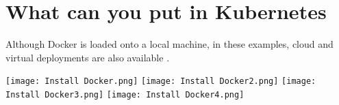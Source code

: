 \documentclass[12pt, letterpaper]{article}
\begin{document}
\section *{What can you put in Kubernetes}

Although Docker is loaded onto a local machine, in these examples,
cloud and virtual deployments are also available
\cite{hid-sp18-525-docker}. 

\texttt{[image: Install Docker.png]}
\texttt{[image: Install Docker2.png]}
\texttt{[image: Install Docker3.png]}
\texttt{[image: Install Docker4.png]}





\end{document}
